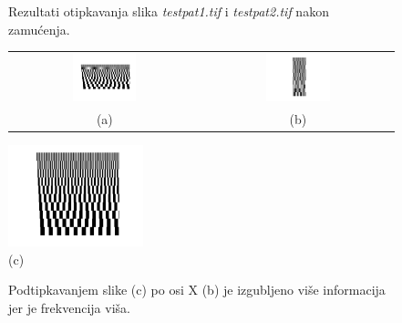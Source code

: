 \documentclass[12pt, a4]{report}
\begin{document}
\begin{enumerate}
\begin{figure}
\begin{tabular}{cc}
                    \end{tabular}
                    \caption{Rezultati otipkavanja slika {\it testpat1.tif} i {\it testpat2.tif} nakon zamućenja.}    
                    \label{fig:sampling4}
                \end{figure}
                \begin{figure}
                    \centering
                    \begin{tabular}{cc}
                        \includegraphics[width=0.35\textwidth]{uzorakS1} & \includegraphics[width=0.35\textwidth]{uzorakS2} \\
                        (a) & (b)
                    \end{tabular}
                    \includegraphics[width=0.35\textwidth]{uzorak} \\
                    (c)
                    \caption{Podtipkavanjem slike (c) po osi X (b) je izgubljeno više informacija jer je frekvencija viša.}    
                    \label{fig:sampling5}
                \end{figure}
                \begin{figure}
                    \centering
                    \begin{tabular}{cc}

\end{tabular}
\end{figure}
\end{enumerate}
\end{document}
